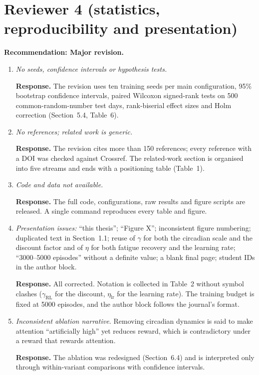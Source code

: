 \documentclass[11pt]{article}
\newcommand{\resp}[1]{\par\noindent\textbf{Response.} #1\par\medskip}
\begin{document}
\section{Reviewer 4 (statistics, reproducibility and presentation)}
\textbf{Recommendation: Major revision.}
\begin{enumerate}[label=R4.\arabic*]
\item \textit{No seeds, confidence intervals or hypothesis tests.}
\resp{The revision uses ten training seeds per main configuration, 95\% bootstrap confidence intervals, paired Wilcoxon signed-rank tests on 500 common-random-number test days, rank-biserial effect sizes and Holm correction \cite{henderson2018,agarwal2021,wilcoxon1945,holm1979} (Section~5.4, Table~6).}
\item \textit{No references; related work is generic.}
\resp{The revision cites more than 150 references; every reference with a DOI was checked against Crossref. The related-work section is organised into five streams and ends with a positioning table (Table~1).}
\item \textit{Code and data not available.}
\resp{The full code, configurations, raw results and figure scripts are released. A single command reproduces every table and figure.}
\item \textit{Presentation issues:} ``this thesis''; ``Figure X''; inconsistent figure numbering; duplicated text in Section~1.1; reuse of $\gamma$ for both the circadian scale and the discount factor and of $\eta$ for both fatigue recovery and the learning rate; ``3000--5000 episodes'' without a definite value; a blank final page; student IDs in the author block.
\resp{All corrected. Notation is collected in Table~2 without symbol clashes ($\gamma_{\mathrm{RL}}$ for the discount, $\eta_{\mathrm{lr}}$ for the learning rate). The training budget is fixed at 5000 episodes, and the author block follows the journal's format.}
\item \textit{Inconsistent ablation narrative.} Removing circadian dynamics is said to make attention ``artificially high'' yet reduces reward, which is contradictory under a reward that rewards attention.
\resp{The ablation was redesigned (Section~6.4) and is interpreted only through within-variant comparisons with confidence intervals.}
\end{enumerate}
\end{document}
